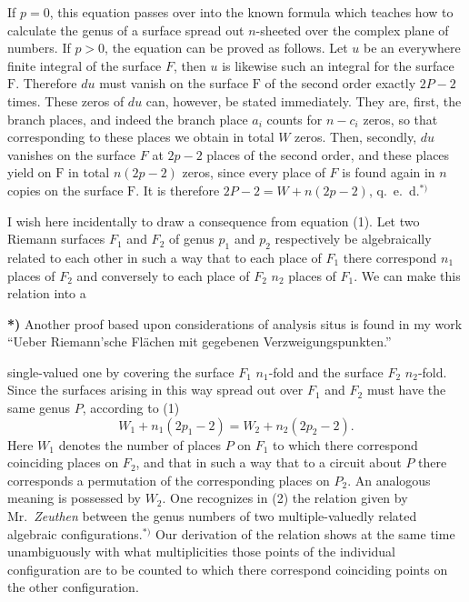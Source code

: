 \documentclass{article}
\begin{document}
If $p = 0$, this equation passes over into the known formula which teaches how to calculate the genus of a surface spread out $n$-sheeted over the complex plane of numbers. If $p > 0$, the equation can be proved as follows. Let $u$ be an everywhere finite integral of the surface $F$, then $u$ is likewise such an integral for the surface $\mathrm{F}$. Therefore $du$ must vanish on the surface $\mathrm{F}$ of the second order exactly $2P - 2$ times. These zeros of $du$ can, however, be stated immediately. They are, first, the branch places, and indeed the branch place $a_i$ counts for $n - c_i$ zeros, so that corresponding to these places we obtain in total $W$ zeros. Then, secondly, $du$ vanishes on the surface $F$ at $2p - 2$ places of the second order, and these places yield on $\mathrm{F}$ in total $n(2p - 2)$ zeros, since every place of $F$ is found again in $n$ copies on the surface $\mathrm{F}$. It is therefore $2P - 2 = W + n(2p - 2)$, q.~e.~d.${}^{*)}$

I wish here incidentally to draw a consequence from equation (1). Let two Riemann surfaces $F_1$ and $F_2$ of genus $p_1$ and $p_2$ respectively be algebraically related to each other in such a way that to each place of $F_1$ there correspond $n_1$ places of $F_2$ and conversely to each place of $F_2$ $n_2$ places of $F_1$. We can make this relation into a

\textbf{*)} Another proof based upon considerations of analysis situs is found in my work ``Ueber Riemann'sche Flächen mit gegebenen Verzweigungspunkten.''

single-valued one by covering the surface $F_1$ $n_1$-fold and the surface $F_2$ $n_2$-fold. Since the surfaces arising in this way spread out over $F_1$ and $F_2$ must have the same genus $P$, according to (1)
\[
W_1 + n_1(2p_1 - 2) = W_2 + n_2(2p_2 - 2).
\tag{2}
\]
Here $W_1$ denotes the number of places $P$ on $F_1$ to which there correspond coinciding places on $F_2$, and that in such a way that to a circuit about $P$ there corresponds a permutation of the corresponding places on $P_2$. An analogous meaning is possessed by $W_2$. One recognizes in (2) the relation given by Mr.~\emph{Zeuthen} between the genus numbers of two multiple-valuedly related algebraic configurations.${}^{*)}$ Our derivation of the relation shows at the same time unambiguously with what multiplicities those points of the individual configuration are to be counted to which there correspond coinciding points on the other configuration.
\end{document}
